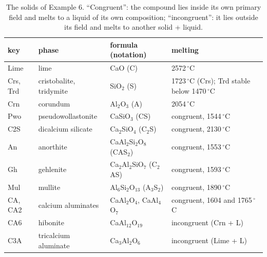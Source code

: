 \documentclass[11pt,a4paper]{article}
\begin{document}
\begin{table}[H]
\centering\small
\caption{The solids of Example 6. ``Congruent'': the compound lies inside its own primary field and melts to a
liquid of its own composition; ``incongruent'': it lies outside its field and melts to another solid + liquid.}
\label{tab:cas}
\begin{tabular}{@{}llll@{}}
\toprule
key & phase & formula (notation) & melting \\ \midrule
Lime & lime & CaO (C) & 2572\,$^\circ$C \\
Crs, Trd & cristobalite, tridymite & SiO$_2$ (S) & 1723\,$^\circ$C (Crs); Trd stable below 1470\,$^\circ$C \\
Crn & corundum & Al$_2$O$_3$ (A) & 2054\,$^\circ$C \\
Pwo & pseudowollastonite & CaSiO$_3$ (CS) & congruent, 1544\,$^\circ$C \\
C2S & dicalcium silicate & Ca$_2$SiO$_4$ (C$_2$S) & congruent, 2130\,$^\circ$C \\
An & anorthite & CaAl$_2$Si$_2$O$_8$ (CAS$_2$) & congruent, 1553\,$^\circ$C \\
Gh & gehlenite & Ca$_2$Al$_2$SiO$_7$ (C$_2$AS) & congruent, 1593\,$^\circ$C \\
Mul & mullite & Al$_6$Si$_2$O$_{13}$ (A$_3$S$_2$) & congruent, 1890\,$^\circ$C \\
CA, CA2 & calcium aluminates & CaAl$_2$O$_4$, CaAl$_4$O$_7$ & congruent, 1604 and 1765\,$^\circ$C \\
CA6 & hibonite & CaAl$_{12}$O$_{19}$ & incongruent (Crn + L) \\
C3A & tricalcium aluminate & Ca$_3$Al$_2$O$_6$ & incongruent (Lime + L) \\
\bottomrule
\end{tabular}
\end{table}
\end{document}
